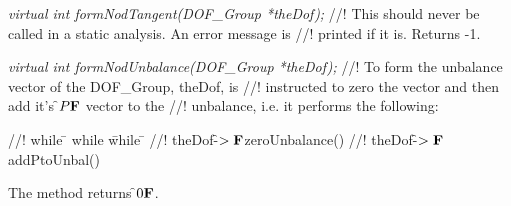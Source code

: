 {\em virtual int formNodTangent(DOF\_Group *theDof);}
//! This should never be called in a static analysis. An error message is
//! printed if it is. Returns -1.


{\em virtual int formNodUnbalance(DOF\_Group *theDof);}
//! To form the unbalance vector of the DOF\_Group, \p theDof, is
//! instructed to zero the vector and then add it's \f$P{\bf F}$ vector to the
//! unbalance, i.e. it performs the following: 
\begin{tabbing}
//! while \= \+ while \= while \= \kill
//! theDof-\f$>{\bf F}$zeroUnbalance()
//! theDof-\f$>{\bf F}$addPtoUnbal() 
\end{tabbing}
\noindent The method returns \f$0{\bf F}$.



